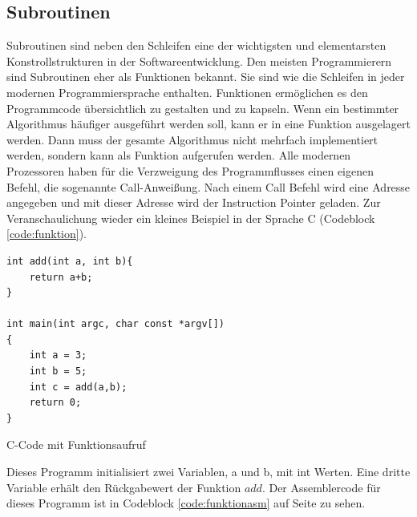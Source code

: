 \documentclass[12pt]{article}
\begin{document}
\subsection{Subroutinen} \label{subsec:subroutinen}
Subroutinen sind neben den Schleifen eine der wichtigsten und elementarsten Konstrollstrukturen in der Softwareentwicklung. Den meisten Programmierern sind Subroutinen eher als Funktionen bekannt. Sie sind wie die Schleifen in jeder modernen Programmiersprache enthalten. Funktionen ermöglichen es den Programmcode übersichtlich zu gestalten und zu kapseln. Wenn ein bestimmter Algorithmus häufiger ausgeführt werden soll, kann er in eine Funktion ausgelagert werden. Dann muss der gesamte Algorithmus nicht mehrfach implementiert werden, sondern kann als Funktion aufgerufen werden. Alle modernen Prozessoren haben für die Verzweigung des Programmflusses einen eigenen Befehl, die sogenannte Call-Anweißung. Nach einem Call Befehl wird eine Adresse angegeben und mit dieser Adresse wird der Instruction Pointer geladen. Zur Veranschaulichung wieder ein kleines Beispiel in der Sprache C (Codeblock \ref{code:funktion}).  

\begin{code}[!htb]
\begin{lstlisting}
int add(int a, int b){
	return a+b;
}

int main(int argc, char const *argv[])
{
	int a = 3;
	int b = 5;
	int c = add(a,b); 
	return 0;
}
\end{lstlisting}
\caption[C Code Funktionen]{C-Code mit Funktionsaufruf}
\label{code:funktion}
\end{code}

\noindent Dieses Programm initialisiert zwei Variablen, a und b, mit int Werten. Eine dritte Variable erhält den Rückgabewert der Funktion $add$. Der Assemblercode für dieses Programm ist in Codeblock \ref{code:funktionasm} auf Seite \pageref{code:funktionasm} zu sehen. 
 
\end{document}
